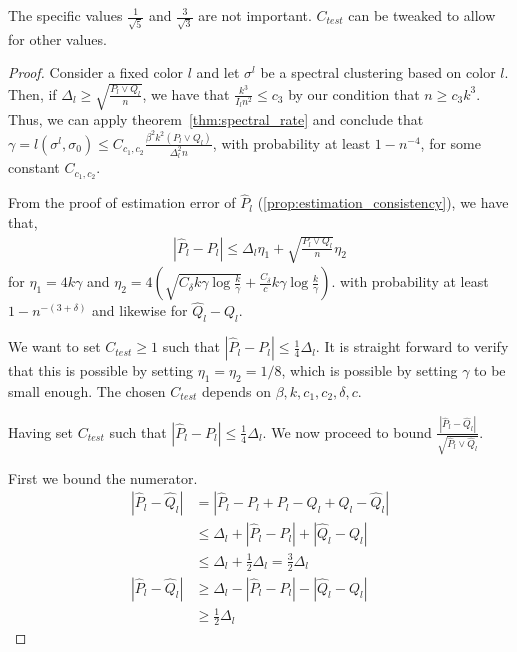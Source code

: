 \documentclass{article}
\begin{document}
The specific values $\frac{1}{\sqrt{5}}$ and $\frac{3}{\sqrt{3}}$ are not important. $C_{test}$ can be tweaked to allow for other values. 

\begin{proof} 

Consider a fixed color $l$ and let $\sigma^l$ be a spectral clustering based on color $l$. Then, if $\Delta_l \geq \sqrt{ \frac{P_l \vee Q_l}{n} }$, we have that $\frac{k^3}{I_l n^2} \leq c_3$ by our condition that $n \geq c_3 k^3$. Thus, we can apply theorem~\ref{thm:spectral_rate} and conclude that $\gamma = l(\sigma^l, \sigma_0) \leq C_{c_1,c_2} \frac{\beta^2 k^2 (P_l \vee Q_l)}{\Delta_l^2 n}$, with probability at least $1 - n^{-4}$, for some constant $C_{c_1, c_2}$. 

From the proof of estimation error of $\hat{P}_l$ (\ref{prop:estimation_consistency}), we have that,
\begin{align*}
|\hat{P}_l - P_l| \leq \Delta_l \eta_1 + \sqrt{\frac{P_l \vee Q_l}{n} }\eta_2
\end{align*}
for $\eta_1 = 4 k \gamma$ and 
$\eta_2 = 4 \left( \sqrt{ C_\delta k \gamma \log \frac{k}{\gamma}} + \frac{C_\delta}{c} k \gamma \log \frac{k}{\gamma} \right)$. 
with probability at least $1 - n^{-(3+\delta)}$  and likewise for $\hat{Q}_l - Q_l$. 

We want to set $C_{test} \geq 1$ such that $|\hat{P}_l - P_l | \leq \frac{1}{4} \Delta_l$. It is straight forward to verify that this is possible by setting $\eta_1 = \eta_2 = 1/8$, which is possible by setting $\gamma$ to be small enough. The chosen $C_{test}$ depends on $\beta, k, c_1, c_2, \delta, c$. 

Having set $C_{test}$ such that $| \hat{P}_l - P_l | \leq \frac{1}{4} \Delta_l$. We now proceed to bound $\frac{| \hat{P}_l - \hat{Q}_l| }{\sqrt{\hat{P}_l \vee \hat{Q}_l}}$. 

First we bound the numerator.
\begin{align*}
|\hat{P}_l - \hat{Q}_l| &= | \hat{P}_l - P_l + P_l - Q_l + Q_l - \hat{Q}_l| \\
    &\leq \Delta_l + | \hat{P}_l - P_l| + |\hat{Q}_l - Q_l| \\
    &\leq \Delta_l + \frac{1}{2} \Delta_l = \frac{3}{2} \Delta_l \\
|\hat{P}_l - \hat{Q}_l| &\geq \Delta_l - |\hat{P}_l - P_l| - |\hat{Q}_l - Q_l| \\
    &\geq \frac{1}{2} \Delta_l
\end{align*}


\end{proof}
\end{document}
